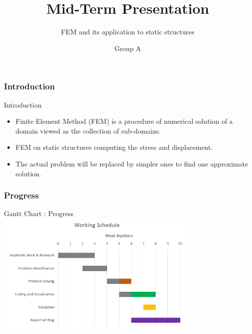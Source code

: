 \documentclass{beamer}
\title{\Huge Mid-Term Presentation}
\subtitle{FEM and its application to static structures}
\author{Group A}
\begin{document}
	
	\maketitle

\logo{}


\part{}
\section{Introduction}
\begin{frame}{Introduction}
	\begin{itemize}
		\item  Finite Element Method (FEM) is a procedure of numerical solution of a domain viewed as the collection of sub-domains.
		\vspace{0.6cm}
		\item FEM on static structures computing the stress and displacement.
		\vspace{0.6cm}
		\item The actual problem will be replaced by simpler ones to find one approximate solution. 
	\end{itemize}
	
\end{frame}


\section{Progress}
\begin{frame}{Gantt Chart : Progress}
	\includegraphics[width = 10cm, height = 6cm]{progress.png}
\end{frame}

\end{document}
